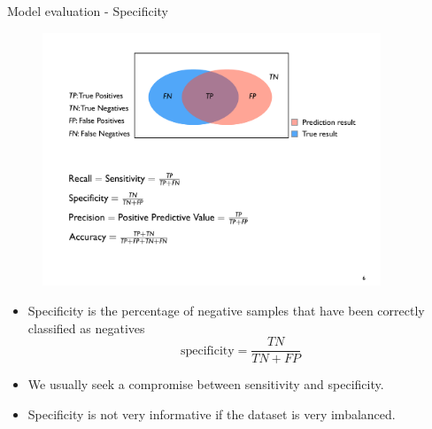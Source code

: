 \documentclass[xcolor=pdftex,dvipsnames,table]{beamer}
\begin{document}
\begin{frame}{Model evaluation - Specificity}
	\begin{figure}[htb]
		\includegraphics[width=0.9\textwidth]{../graphics/ModelEvaluation.pdf}
	\end{figure}
	\begin{itemize}
		\item Specificity is the percentage of negative samples that have been correctly classified as negatives
		\begin{equation}
			\text{specificity} = \frac{TN}{TN + FP}
		\end{equation}
		\item We usually seek a compromise between sensitivity and specificity.
		\item Specificity is not very informative if the dataset is very imbalanced.
	\end{itemize}
\end{frame}

\end{document}
